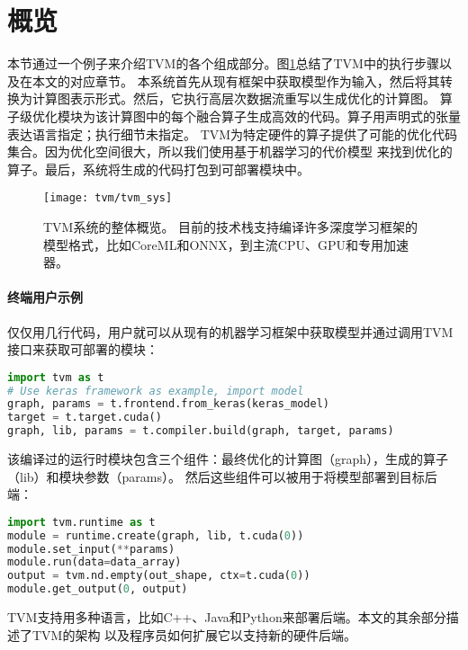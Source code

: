 \section{概览}
本节通过一个例子来介绍TVM的各个组成部分。图\ref{fig:tvm sys}总结了TVM中的执行步骤以及在本文的对应章节。
本系统首先从现有框架中获取模型作为输入，然后将其转换为计算图表示形式。然后，它执行高层次数据流重写以生成优化的计算图。
算子级优化模块为该计算图中的每个融合算子生成高效的代码。算子用声明式的张量表达语言指定；执行细节未指定。
TVM为特定硬件的算子提供了可能的优化代码集合。因为优化空间很大，所以我们使用基于机器学习的代价模型
来找到优化的算子。最后，系统将生成的代码打包到可部署模块中。

\begin{figure}[htbp]
    \centering
    \texttt{[image: tvm/tvm\_sys]}
    \caption{\label{fig:tvm sys}TVM系统的整体概览。
    目前的技术栈支持编译许多深度学习框架的模型格式，比如CoreML和ONNX，到主流CPU、GPU和专用加速器。}
\end{figure}

\paragraph{终端用户示例}
仅仅用几行代码，用户就可以从现有的机器学习框架中获取模型并通过调用TVM接口来获取可部署的模块：

\begin{lstlisting}[language={Python}]
import tvm as t
# Use keras framework as example, import model
graph, params = t.frontend.from_keras(keras_model)
target = t.target.cuda()
graph, lib, params = t.compiler.build(graph, target, params) 
\end{lstlisting}

该编译过的运行时模块包含三个组件：最终优化的计算图（graph），生成的算子（lib）和模块参数（params）。
然后这些组件可以被用于将模型部署到目标后端：

\begin{lstlisting}[language={Python}]
import tvm.runtime as t
module = runtime.create(graph, lib, t.cuda(0))
module.set_input(**params)
module.run(data=data_array)
output = tvm.nd.empty(out_shape, ctx=t.cuda(0))
module.get_output(0, output)
\end{lstlisting}

TVM支持用多种语言，比如C++、Java和Python来部署后端。本文的其余部分描述了TVM的架构
以及程序员如何扩展它以支持新的硬件后端。